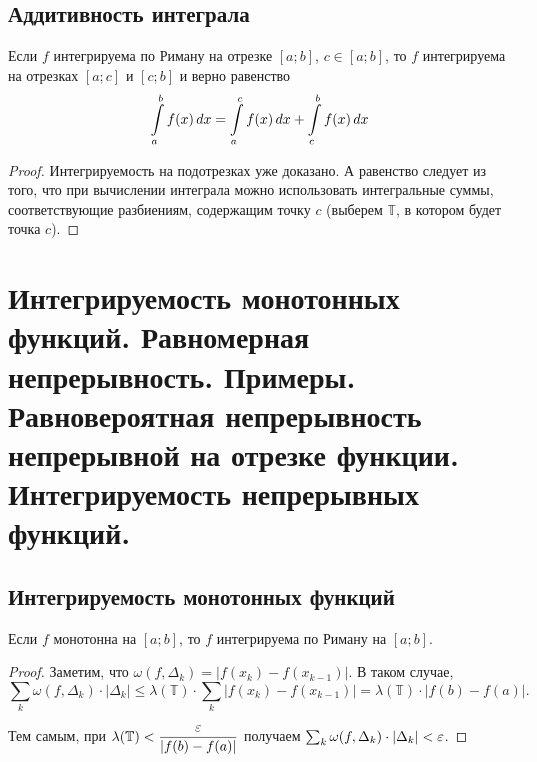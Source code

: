 \documentclass[a4paper]{article}
\theoremstyle{named}
\newcommand{\T}{\mathbb{T}}
\renewcommand{\int}{\intop}
\begin{document}
        \subsection{Аддитивность интеграла}

        \begin{consequence*}
            Если $f$ интегрируема по Риману на отрезке $[a; b]$, $c \in [a; b]$, то $f$ интегрируема на отрезках $[a; c]$ и $[c; b]$ и верно равенство
            \begin{equation*}
                \int_a^b f(x) \dd x = \int_a^c f(x) \dd x + \int_c^b f(x) \dd x
            \end{equation*}
        \end{consequence*}

        \begin{proof}
            Интегрируемость на подотрезках уже доказано. А равенство следует из того, что при вычислении интеграла можно использовать интегральные суммы, соответствующие разбиениям, содержащим точку $c$ (выберем $\T$, в котором будет точка $c$).
        \end{proof}

    \section{Интегрируемость монотонных функций. Равномерная непрерывность. Примеры. Равновероятная непрерывность непрерывной на отрезке функции. Интегрируемость непрерывных функций.}

        \subsection{Интегрируемость монотонных функций}

        \begin{consequence*}
            Если $f$ монотонна на $[a; b]$, то $f$ интегрируема по Риману на $[a; b]$.
        \end{consequence*}

        \begin{proof}
            Заметим, что $\omega(f, \Delta_k) = |f(x_k) - f(x_{k - 1})|$. В таком случае,
            \begin{equation*}
                \sum_k \omega(f, \Delta_k) \cdot |\Delta_k| \leq \lambda(\T) \cdot \sum_k |f(x_k) - f(x_{k - 1})| = \lambda(\T) \cdot |f(b) - f(a)|.
            \end{equation*}

            Тем самым, при $\lambda(\T) < \dfrac{\eps}{|f(b) - f(a)|}$ получаем $\sum_k \omega(f, \Delta_k) \cdot |\Delta_k| < \varepsilon$.
        \end{proof}
\end{document}
